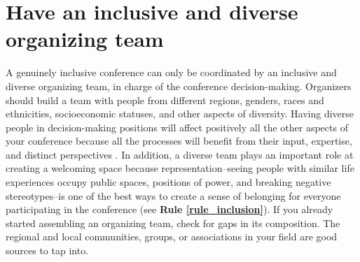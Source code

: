 \documentclass[10pt,letterpaper]{article}
\begin{document}

\section{Have an inclusive and diverse organizing team}
\label{rule_organizing_team}


A genuinely inclusive conference can only be coordinated  by an inclusive and diverse organizing team, in charge of the conference decision-making.
Organizers should build a team with people from different regions, genders, races and ethnicities, socioeconomic statuses, and other aspects of diversity.
Having diverse people in decision-making positions will affect positively all the other aspects of your conference because all the processes will benefit from their input, expertise, and distinct perspectives \cite{hongGroupsDiverseProblem2004}. 
In addition, a diverse team plays an important role at creating a welcoming space because representation--seeing people with similar life experiences occupy public spaces, positions of power, and breaking negative stereotypes--is one of the best ways to create a sense of belonging for everyone participating in the conference (see \textbf{Rule \ref{rule_inclusion}}). If you already started assembling an organizing team, check for gaps in its composition. 
The regional and local communities, groups, or associations in your field are good sources to tap into. 
\end{document}
